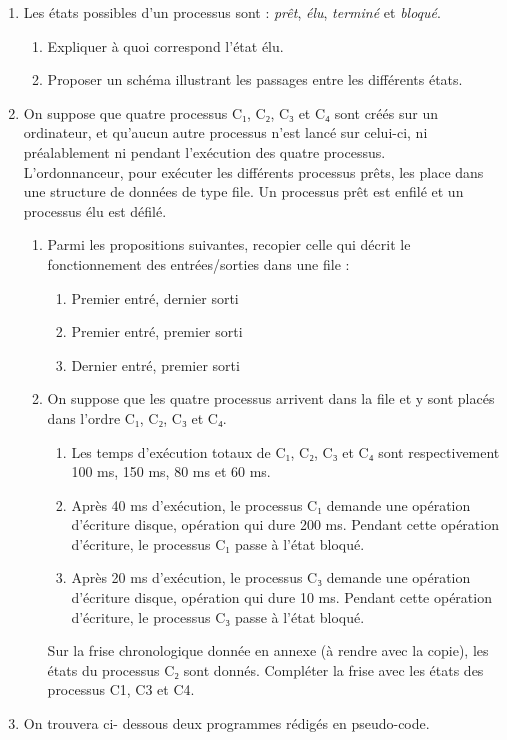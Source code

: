 \documentclass[a4paper,12pt,french]{book}
\begin{document}
\begin{enumerate}[\bfseries 1.]
	\item 	Les états possibles d’un processus sont : \textit{prêt}, \textit{élu}, \textit{terminé} et \textit{bloqué}.
    \begin{enumerate}[\bfseries a.]
    	\item 	Expliquer à quoi correspond l’état élu.
    	\item 	Proposer un schéma illustrant les passages entre les différents états.
    \end{enumerate}
	\item 	 	On suppose que quatre processus C₁, C₂, C₃ et C₄ sont créés sur un ordinateur,
    et qu’aucun autre processus n’est lancé sur celui-ci, ni préalablement ni pendant
    l’exécution des quatre processus.\\

    L’ordonnanceur, pour exécuter les différents processus prêts, les place dans une
    structure de données de type file. Un processus prêt est enfilé et un processus
    élu est défilé.

    \begin{enumerate}[\bfseries a.]
    	\item 	Parmi les propositions suivantes, recopier celle qui décrit le fonctionnement
        des entrées/sorties dans une file :
        \begin{enumerate}[--]
        	\item   Premier entré, dernier sorti
        	\item 	Premier entré, premier sorti
            \item   Dernier entré, premier sorti
        \end{enumerate}
    \item  On suppose que les quatre processus arrivent dans la file et y sont placés
    dans l’ordre C₁, C₂, C₃ et C₄.
    \begin{enumerate}[--]
    	\item 	Les temps d’exécution totaux de C₁, C₂, C₃ et C₄ sont respectivement
            100 ms, 150 ms, 80 ms et 60 ms.
    	\item 	Après 40 ms d’exécution, le processus C₁ demande une opération d’écriture
            disque, opération qui dure 200 ms. Pendant cette opération d’écriture, le
            processus C₁ passe à l’état bloqué.
        \item   Après 20 ms d’exécution, le processus C₃ demande une opération d’écriture
            disque, opération qui dure 10 ms. Pendant cette opération d’écriture, le
            processus C₃ passe à l’état bloqué.
    \end{enumerate}
    Sur la frise chronologique donnée en annexe (à rendre avec la copie), les
    états du processus C₂ sont donnés. Compléter la frise avec les états des
    processus C1, C3 et C4.
    \end{enumerate}
    \item On trouvera ci- dessous deux programmes rédigés en pseudo-code.\\


\end{enumerate}
\end{document}
